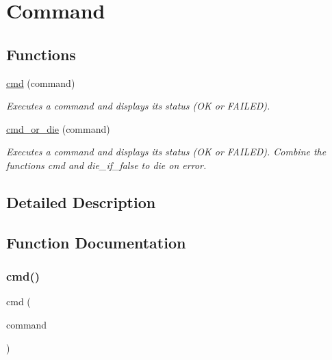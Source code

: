 \hypertarget{group__command}{}\section{Command}
\label{group__command}
\subsection*{Functions}
\begin{DoxyCompactItemize}
\item 
\hyperlink{group__command_ga9d48c63ba9b6d46e9d60ae5f4c2f0446}{cmd} (command)
\begin{DoxyCompactList}\small\item\em Executes a command and displays its status (\textquotesingle{}OK\textquotesingle{} or \textquotesingle{}F\+A\+I\+L\+ED\textquotesingle{}). \end{DoxyCompactList}\item 
\hyperlink{group__command_ga11d55e4afce37b27eb723d25fd4bf00e}{cmd\+\_\+or\+\_\+die} (command)
\begin{DoxyCompactList}\small\item\em Executes a command and displays its status (\textquotesingle{}OK\textquotesingle{} or \textquotesingle{}F\+A\+I\+L\+ED\textquotesingle{}). Combine the functions {\ttfamily cmd} and {\ttfamily die\+\_\+if\+\_\+false} to die on error. \end{DoxyCompactList}\end{DoxyCompactItemize}


\subsection{Detailed Description}


\subsection{Function Documentation}
\mbox{\label{group__command_ga9d48c63ba9b6d46e9d60ae5f4c2f0446}} 
\subsubsection{\texorpdfstring{cmd()}{cmd()}}
{\footnotesize\ttfamily cmd (\begin{DoxyParamCaption}\item[{command}]{ }\end{DoxyParamCaption})}



